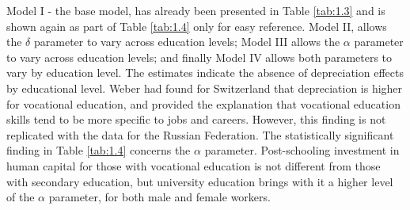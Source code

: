 \documentclass[alpha-refs]{wiley-article-02b}
\begin{document}
\vspace{3pt}

Model I - the base model, has already been presented in Table \ref{tab:1.3} 
and is shown again as part of Table \ref{tab:1.4} only for easy reference. 
Model II, allows the $\delta$ parameter to vary across education levels; 
Model III allows the $\alpha$ parameter to vary across education levels; 
and finally Model IV allows both parameters to vary by education level. The 
estimates indicate the absence of depreciation effects by educational 
level. Weber had found for Switzerland  that depreciation is higher for 
vocational education, and provided the explanation that vocational 
education skills tend to be more specific to jobs and careers. However, 
this finding is not replicated with the data for the Russian Federation. 
The statistically significant finding in Table \ref{tab:1.4} concerns the 
$\alpha$ parameter. Post-schooling investment in human capital for those 
with vocational education is not different from those with secondary 
education, but university education brings with it a higher level of the 
$\alpha$ parameter, for both male and female workers. 
\end{document}
